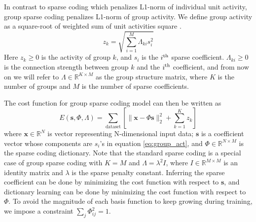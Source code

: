 In contrast to sparse coding which penalizes L1-norm of individual unit activity, group sparse coding penalizes L1-norm of group activity. We define group activity as a square-root of weighted sum of unit activities square \cite{ha01sc}.
\begin{equation}
\label{eq:group_act}
z_k = \sqrt{\sum_{i=1}^M \Lambda_{ki}s_i^2}
\end{equation}
Here $z_k \geq 0$ is the activity of group $k$, and $s_i$ is the $i^{\text{\scriptsize{th}}}$ sparse coefficient. $\Lambda_{ki} \geq 0$ is the connection strength between group $k$ and the $i^{\text{\scriptsize{th}}}$ coefficient, and from now on we will refer to $\Lambda \in \mathbb{R}^{K\times M}$ as the group structure matrix, where $K$ is the number of groups and $M$ is the number of sparse coefficients.

The cost function for group sparse coding model can then be written as
\begin{equation}
\label{eq:groupcost}
E(\boldsymbol{s}, \Phi, \Lambda) = \sum_{\text{dataset}} \left[
	\|\boldsymbol{x} - \Phi\boldsymbol{s}\|_2^2 +
	\sum_{k=1}^K z_k
\right]
\end{equation}
where $\boldsymbol{x} \in \mathbb{R}^N$ is vector representing N-dimensional input data; $\boldsymbol{s}$ is a coefficient vector whose components are $s_i$'s in equation \ref{eq:group_act}, and $\Phi \in \mathbb{R}^{N \times M}$ is the sparse coding dictionary. Note that the standard sparse coding is a special case of group sparse coding with $K = M$ and $\Lambda = \lambda^2 I$, where $I \in \mathbb{R}^{M\times M}$ is an identity matrix and $\lambda$ is the sparse penalty constant. Inferring the sparse coefficient can be done by minimizing the cost function with respect to $\boldsymbol{s}$, and dictionary learning can be done by minimizing the cost function with respect to $\Phi$. To avoid the magnitude of each basis function to keep growing during training, we impose a constraint $\sum_j \Phi_{ij} ^ 2 = 1$.

